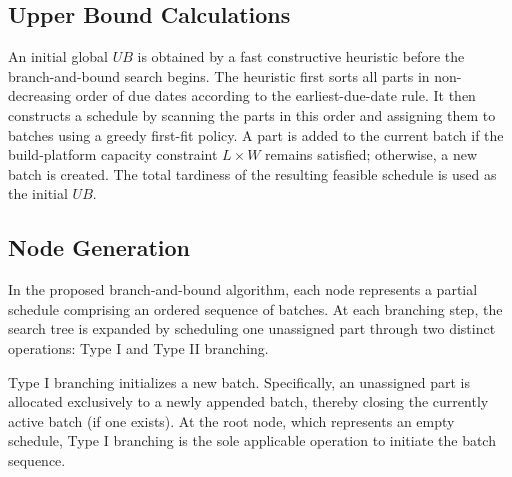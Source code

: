 \documentclass[letterpaper, 10 pt, conference]{ieeeconf}  %
\begin{document}
\subsection{Upper Bound Calculations}


An initial global $UB$ is obtained by a fast constructive heuristic before the branch-and-bound search begins. The heuristic first sorts all parts in non-decreasing order of due dates according to the earliest-due-date rule. It then constructs a schedule by scanning the parts in this order and assigning them to batches using a greedy first-fit policy. A part is added to the current batch if the build-platform capacity constraint $L \times W$ remains satisfied; otherwise, a new batch is created. The total tardiness of the resulting feasible schedule is used as the initial $UB$.


\subsection{Node Generation}

In the proposed branch-and-bound algorithm, each node represents a partial schedule comprising an ordered sequence of batches. At each branching step, the search tree is expanded by scheduling one unassigned part through two distinct operations: Type I and Type II branching.

Type I branching initializes a new batch. Specifically, an unassigned part is allocated exclusively to a newly appended batch, thereby closing the currently active batch (if one exists). At the root node, which represents an empty schedule, Type I branching is the sole applicable operation to initiate the batch sequence.
\end{document}
